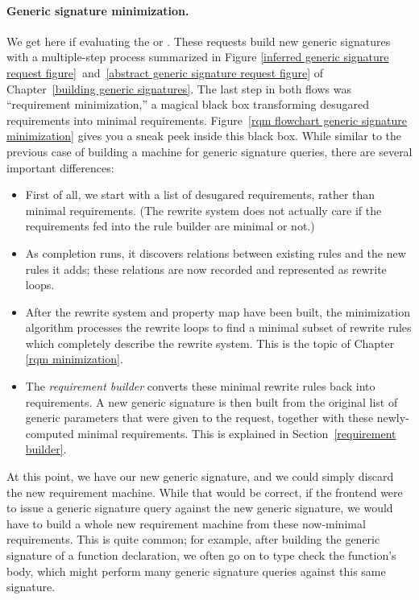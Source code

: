 \documentclass[../generics]{subfiles}
\begin{document}
\paragraph{Generic signature minimization.}
%
%
%
%
We get here if evaluating the  or . These requests build new generic signatures with a multiple-step process summarized in Figure \ref{inferred generic signature request figure}~and~\ref{abstract generic signature request figure} of Chapter~\ref{building generic signatures}. The last step in both flows was ``requirement minimization,'' a magical black box transforming desugared requirements into minimal requirements. Figure~\ref{rqm flowchart generic signature minimization} gives you a sneak peek inside this black box. While similar to the previous case of building a machine for generic signature queries, there are several important differences:
\begin{itemize}
\item First of all, we start with a list of desugared requirements, rather than minimal requirements. (The rewrite system does not actually care if the requirements fed into the rule builder are minimal or not.)
\item As completion runs, it discovers relations between existing rules and the new rules it adds; these relations are now recorded and represented as rewrite loops.
\item After the rewrite system and property map have been built, the minimization algorithm processes the rewrite loops to find a minimal subset of rewrite rules which completely describe the rewrite system. This is the topic of Chapter \ref{rqm minimization}.
%
\item The \emph{requirement builder} converts these minimal rewrite rules back into requirements. A new generic signature is then built from the original list of generic parameters that were given to the request, together with these newly-computed minimal requirements. This is explained in Section~\ref{requirement builder}.
\end{itemize}

At this point, we have our new generic signature, and we could simply discard the new requirement machine. While that would be correct, if the frontend were to issue a generic signature query against the new generic signature, we would have to build a whole new requirement machine from these now-minimal requirements. This is quite common; for example, after building the generic signature of a function declaration, we often go on to type check the function's body, which might perform many generic signature queries against this same signature.
\end{document}
